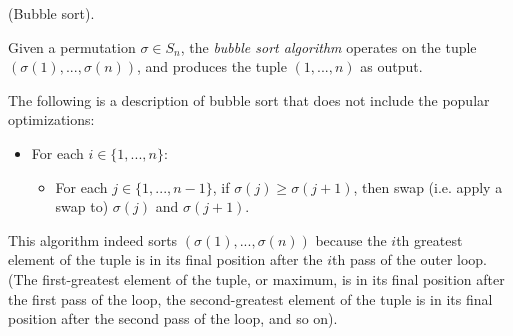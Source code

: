 \begin{defn}
\label{ch::appendix::defn::bubble_sort}
    (Bubble sort).
    
    Given a permutation $\sigma \in S_n$, the \textit{bubble sort algorithm} operates on the tuple $(\sigma(1), ..., \sigma(n))$, and produces the tuple $(1, ..., n)$ as output.
    
    The following is a description of bubble sort that does not include the popular optimizations:
    
    \begin{itemize}
        \item For each $i \in \{1, ..., n\}$:
        \begin{itemize}
            \item For each $j \in \{1, ..., n - 1\}$, if $\sigma(j) \geq \sigma(j + 1)$, then swap (i.e. apply a swap to) $\sigma(j)$ and $\sigma(j + 1)$.
        \end{itemize}
    \end{itemize}
    
    This algorithm indeed sorts $(\sigma(1), ..., \sigma(n))$ because the $i$th greatest element of the tuple is in its final position after the $i$th pass of the outer loop. (The first-greatest element of the tuple, or maximum, is in its final position after the first pass of the loop, the second-greatest element of the tuple is in its final position after the second pass of the loop, and so on).
\end{defn}